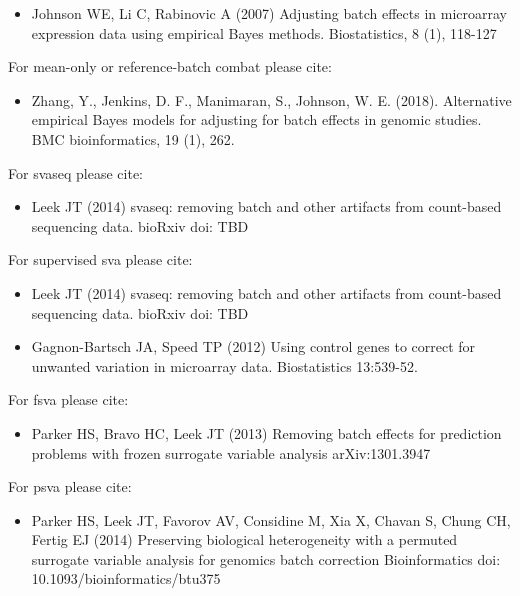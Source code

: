 \documentclass[12pt]{article}
\begin{document}
\begin{itemize}
\item Johnson WE, Li C, Rabinovic A (2007) Adjusting batch effects in microarray expression data using empirical Bayes methods. Biostatistics,  8 (1), 118-127
\end{itemize}

For mean-only or reference-batch combat please cite:

\begin{itemize}
\item Zhang, Y., Jenkins, D. F., Manimaran, S., Johnson, W. E. (2018). Alternative empirical Bayes models for adjusting for batch effects in genomic studies. BMC bioinformatics, 19 (1), 262.
\end{itemize}

For svaseq please cite: 

\begin{itemize}
\item Leek JT (2014) svaseq: removing batch and other artifacts from count-based sequencing data. bioRxiv doi: TBD
\end{itemize}

For supervised sva please cite: 

\begin{itemize}
\item Leek JT (2014) svaseq: removing batch and other artifacts from count-based sequencing data. bioRxiv doi: TBD
\item Gagnon-Bartsch JA, Speed TP (2012) Using control genes to correct for unwanted variation in microarray data. Biostatistics 13:539-52. 
\end{itemize}

For fsva please cite:

\begin{itemize}
\item Parker HS, Bravo HC, Leek JT (2013) Removing batch effects for prediction problems with frozen surrogate variable analysis arXiv:1301.3947
\end{itemize}

For psva please cite: 

\begin{itemize}
\item Parker HS, Leek JT, Favorov AV, Considine M, Xia X, Chavan S, Chung CH, Fertig EJ (2014) Preserving biological heterogeneity with a permuted surrogate variable analysis for genomics batch correction Bioinformatics doi: 10.1093/bioinformatics/btu375
\end{itemize}

 
\end{document}
